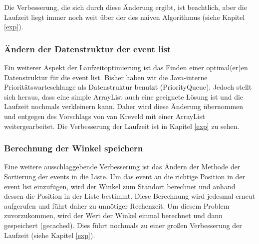 Die Verbesserung, die sich durch diese Änderung ergibt, ist beachtlich, aber die Laufzeit liegt immer noch weit über der des naiven Algorithmus 
(siehe Kapitel \ref{exp}).

\subsubsection{Ändern der Datenstruktur der event list}
\label{list}
Ein weiterer Aspekt der Laufzeitoptimierung ist das Finden einer optimal(er)en Datenstruktur für die event list. Bisher haben wir die Java-interne 
Prioritätswarteschlange als Datenstruktur benutzt (PriorityQueue). Jedoch stellt sich heraus, dass eine simple ArrayList auch eine geeignete Lösung
ist und die Laufzeit nochmals verkleinern kann. Daher wird diese Änderung übernommen und entgegen des Vorschlags von van Kreveld mit einer ArrayList
weitergearbeitet. Die Verbesserung der Laufzeit ist in Kapitel \ref{exp} zu sehen.

\subsubsection{Berechnung der Winkel speichern}
\label{cached}
Eine weitere ausschlaggebende Verbesserung ist das Ändern der Methode der Sortierung der events in die Liste. Um das event an die richtige Position 
in der event list einzufügen, wird der Winkel zum Standort berechnet und anhand dessen die Position in der Liste bestimmt. Diese Berechnung wird 
jedesmal erneut aufgerufen und führt daher zu unnötiger Rechenzeit. Um diesem Problem zuvorzukommen, wird der Wert der Winkel einmal berechnet und 
dann gespeichert (\glqq gecached\grqq). Dies führt nochmals zu einer großen Verbesserung der Laufzeit (siehe Kapitel \ref{exp}).




